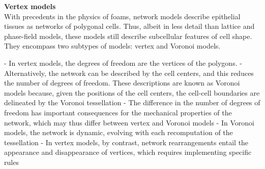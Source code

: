 \textbf{Vertex models} \\

With precedents in the physics of foams, network models describe epithelial tissues as networks of polygonal cells. Thus, albeit in less detail than lattice and phase-field models, these models still describe subcellular features of cell shape. They encompass two subtypes of models: vertex and Voronoi models.

- In vertex models, the degrees of freedom are the vertices of the polygons.
- Alternatively, the network can be described by the cell centers, and this reduces the number of degrees of freedom. These descriptions are known as Voronoi models because, given the positions of the cell centers, the cell-cell boundaries are delineated by the Voronoi tessellation
- The difference in the number of degrees of freedom has important consequences for the mechanical properties of the network, which may thus differ between vertex and Voronoi models 
- In Voronoi models, the network is dynamic, evolving with each recomputation of the tessellation
- In vertex models, by contrast, network rearrangements entail the appearance and disappearance of vertices, which requires implementing specific rules


